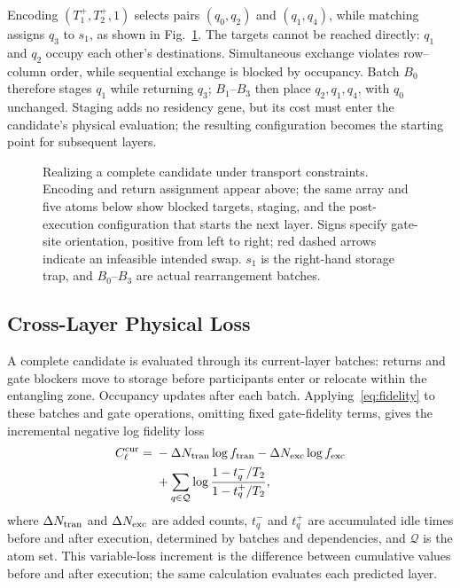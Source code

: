 Encoding $(T_1^+,T_2^+,1)$ selects pairs $(q_0,q_2)$ and $(q_1,q_4)$, while matching assigns $q_3$ to $s_1$, as shown in Fig.~\ref{fig:joint-ga}. The targets cannot be reached directly: $q_1$ and $q_2$ occupy each other's destinations. Simultaneous exchange violates row--column order, while sequential exchange is blocked by occupancy. Batch $B_0$ therefore stages $q_1$ while returning $q_3$; $B_1$--$B_3$ then place $q_2,q_1,q_4$, with $q_0$ unchanged. Staging adds no residency gene, but its cost must enter the candidate's physical evaluation; the resulting configuration becomes the starting point for subsequent layers.

\begin{figure}[!t]
  \centering
  \resizebox{\columnwidth}{!}{}
  \caption{Realizing a complete candidate under transport constraints. Encoding and return assignment appear above; the same array and five atoms below show blocked targets, staging, and the post-execution configuration that starts the next layer. Signs specify gate-site orientation, positive from left to right; red dashed arrows indicate an infeasible intended swap. $s_1$ is the right-hand storage trap, and $B_0$--$B_3$ are actual rearrangement batches.}
  \label{fig:joint-ga}
\end{figure}

\subsection{Cross-Layer Physical Loss}

A complete candidate is evaluated through its current-layer batches: returns and gate blockers move to storage before participants enter or relocate within the entangling zone. Occupancy updates after each batch. Applying~\eqref{eq:fidelity} to these batches and gate operations, omitting fixed gate-fidelity terms, gives the incremental negative log fidelity loss
\begin{equation}
\begin{aligned}
C_\ell^{\rm cur}={}&-\Delta N_{\rm tran}\log f_{\rm tran}
-\Delta N_{\rm exc}\log f_{\rm exc}\\
&+\sum_{q\in\mathcal Q}
\log\frac{1-t_q^{-}/T_2}{1-t_q^{+}/T_2},
\end{aligned}
\label{eq:current-cost}
\end{equation}
where $\Delta N_{\rm tran}$ and $\Delta N_{\rm exc}$ are added counts, $t_q^{-}$ and $t_q^{+}$ are accumulated idle times before and after execution, determined by batches and dependencies, and $\mathcal Q$ is the atom set. This variable-loss increment is the difference between cumulative values before and after execution; the same calculation evaluates each predicted layer.


